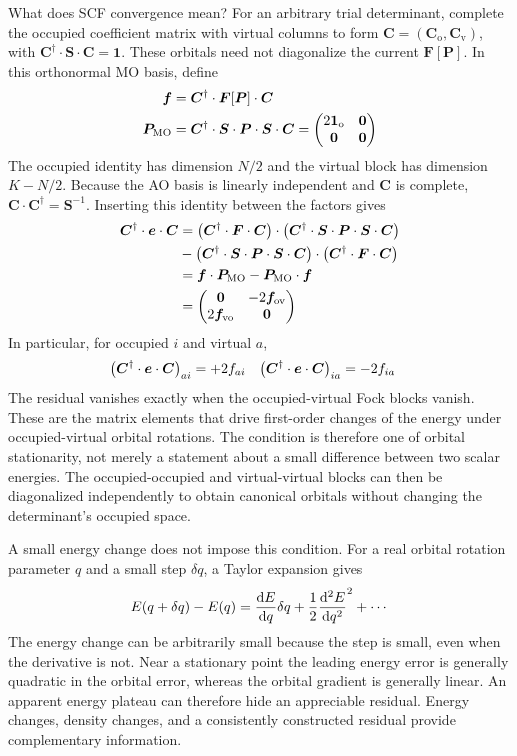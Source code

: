 \documentclass[11pt,a4paper,titlepage]{article}
\numberwithin{equation}{section}
\newcommand{\be}{\boldsymbol{e}}
\newcommand{\bff}{\boldsymbol{f}}
\newcommand{\bC}{\boldsymbol{C}}
\newcommand{\bF}{\boldsymbol{F}}
\newcommand{\bI}{\boldsymbol{1}}
\newcommand{\bO}{\boldsymbol{0}}
\newcommand{\bP}{\boldsymbol{P}}
\newcommand{\bS}{\boldsymbol{S}}
\begin{document}
\begin{hfsolution}{What does SCF convergence mean?}
For an arbitrary trial determinant, complete the occupied coefficient
matrix with virtual columns to form
$\bC=(\bC_\text{o},\bC_\text{v})$, with
$\bC^\dag\cdot\bS\cdot\bC=\bI$. These orbitals need not diagonalize
the current $\bF[\bP]$. In this orthonormal MO basis, define
\begin{align}
  \bff&=\bC^\dag\cdot\bF[\bP]\cdot\bC\\
  \bP_\text{MO}
  &=\bC^\dag\cdot\bS\cdot\bP\cdot\bS\cdot\bC
  =\pmqty{2\bI_\text{o}&\bO\\\bO&\bO}
\end{align}
The occupied identity has dimension $N/2$ and the virtual block has
dimension $K-N/2$. Because the AO basis is linearly independent and
$\bC$ is complete, $\bC\cdot\bC^\dag=\bS^{-1}$. Inserting this identity
between the factors gives
\begin{equation}
\begin{split}
  \bC^\dag\cdot\be\cdot\bC
  &=\qty(\bC^\dag\cdot\bF\cdot\bC)
    \cdot\qty(\bC^\dag\cdot\bS\cdot\bP\cdot\bS\cdot\bC)\\
  &-\qty(\bC^\dag\cdot\bS\cdot\bP\cdot\bS\cdot\bC)
    \cdot\qty(\bC^\dag\cdot\bF\cdot\bC)\\
  &=\bff\cdot\bP_\text{MO}-\bP_\text{MO}\cdot\bff\\
  &=\pmqty{\bO&-2\bff_\text{ov}\\2\bff_\text{vo}&\bO}
\end{split}
\end{equation}
In particular, for occupied $i$ and virtual $a$,
\begin{align}
  \qty(\bC^\dag\cdot\be\cdot\bC)_{ai}&=+2f_{ai}
  &
  \qty(\bC^\dag\cdot\be\cdot\bC)_{ia}&=-2f_{ia}
\end{align}
The residual vanishes exactly when the occupied-virtual Fock blocks
vanish. These are the matrix elements that drive first-order changes of
the energy under occupied-virtual orbital rotations. The condition is
therefore one of orbital stationarity, not merely a statement about a
small difference between two scalar energies. The occupied-occupied and
virtual-virtual blocks can then be diagonalized independently to obtain
canonical orbitals without changing the determinant's occupied space.

A small energy change does not impose this condition. For a real orbital
rotation parameter $q$ and a small step $\delta q$, a Taylor expansion gives
\begin{equation}
  E(q+\delta q)-E(q)
  =\dv{E}{q}\delta q
  +\frac12\dv[2]{E}{q}(\delta q)^2+\cdots
\end{equation}
The energy change can be arbitrarily small because the step is small,
even when the derivative is not. Near a stationary point the leading
energy error is generally quadratic in the orbital error, whereas the
orbital gradient is generally linear. An apparent energy plateau can
therefore hide an appreciable residual. Energy changes, density changes,
and a consistently constructed residual provide complementary information.


\end{hfsolution}
\end{document}

